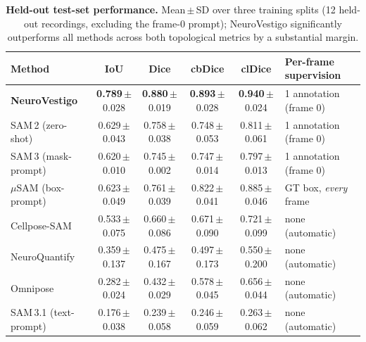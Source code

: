 \documentclass[11pt,a4paper]{article}
\begin{document}
\begin{table}[!htb]
\centering
\caption{\textbf{Held-out test-set performance.} Mean\,$\pm$\,SD over three
training splits (12 held-out recordings, excluding the frame-0 prompt);
NeuroVestigo significantly outperforms all methods across both topological metrics by a
substantial margin.}
\label{tab:main}
\small
\setlength{\tabcolsep}{3.5pt}
\newcommand{\sd}[1]{\,{\scriptsize$\pm$#1}}
\begin{tabular}{lcccc l}
\toprule
Method & IoU & Dice & \textbf{cbDice} & clDice & Per-frame supervision \\
\midrule
\textbf{NeuroVestigo}            & \textbf{0.789}\sd{0.028} & \textbf{0.880}\sd{0.019} & \textbf{0.893}\sd{0.028} & \textbf{0.940}\sd{0.024} & 1 annotation (frame 0) \\
SAM\,2 (zero-shot)       & 0.629\sd{0.043} & 0.758\sd{0.038} & 0.748\sd{0.053} & 0.811\sd{0.061} & 1 annotation (frame 0) \\
SAM\,3 (mask-prompt)     & 0.620\sd{0.010} & 0.745\sd{0.002} & 0.747\sd{0.014} & 0.797\sd{0.013} & 1 annotation (frame 0) \\
$\mu$SAM (box-prompt)    & 0.623\sd{0.049} & 0.761\sd{0.039} & 0.822\sd{0.041} & 0.885\sd{0.046} & GT box, \emph{every} frame \\
Cellpose-SAM             & 0.533\sd{0.075} & 0.660\sd{0.086} & 0.671\sd{0.090} & 0.721\sd{0.099} & none (automatic) \\
NeuroQuantify            & 0.359\sd{0.137} & 0.475\sd{0.167} & 0.497\sd{0.173} & 0.550\sd{0.200} & none (automatic) \\
Omnipose                 & 0.282\sd{0.024} & 0.432\sd{0.029} & 0.578\sd{0.045} & 0.656\sd{0.044} & none (automatic) \\
SAM\,3.1 (text-prompt)   & 0.176\sd{0.038} & 0.239\sd{0.058} & 0.246\sd{0.059} & 0.263\sd{0.062} & none (automatic) \\
\bottomrule
\end{tabular}
\end{table}
\end{document}

